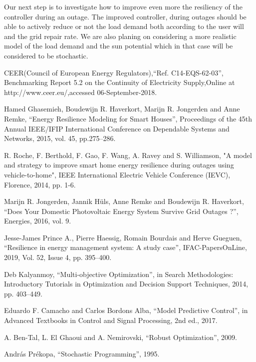 \documentclass[conference]{IEEEtran}
\begin{document}
 Our next step is to investigate how to improve even more the resiliency of the controller during an outage. The improved controller, during outages should be able to actively reduce or not the load demand both according to the user will and the grid repair rate. We are also planing on considering a more realistic model of the load demand and the sun potential which in that case will be considered to be stochastic.
 

\begin{thebibliography}{00}


 CEER(Council of European Energy Regulators),``Ref. C14-EQS-62-03'', Benchmarking Report 5.2 on the Continuity of Electricity Supply,Online at http://www.ceer.eu/,accessed 06-September-2018.

 Hamed Ghasemieh, Boudewijn R. Haverkort, Marijn R. Jongerden and Anne Remke, ``Energy Resilience Modeling for Smart Houses'', Proceedings of the 45th Annual IEEE/IFIP International Conference on Dependable Systems and Networks, 2015, vol. 45, pp.275--286.

 R. Roche, F. Berthold, F. Gao, F. Wang, A. Ravey and S. Williamson, "A model and strategy to improve smart home energy resilience during outages using vehicle-to-home", IEEE International Electric Vehicle Conference (IEVC), Florence, 2014, pp. 1-6.

 Marijn R. Jongerden, Jannik Hüls, Anne Remke and Boudewijn R. Haverkort, ``Does Your Domestic Photovoltaic Energy System Survive Grid Outages ?'', Energies, 2016, vol. 9.

 Jesse-James Prince A., Pierre Haessig, Romain Bourdais and Herve Gueguen, ``Resilience in energy management system: A study case'', IFAC-PapersOnLine, 2019, Vol. 52, Issue 4, pp. 395--400.

 Deb Kalyanmoy, ``Multi-objective Optimization'', in Search Methodologies: Introductory Tutorials in Optimization and Decision Support Techniques, 2014, pp. 403--449.

 Eduardo F. Camacho and Carlos Bordons Alba, ``Model Predictive Control'', in Advanced Textbooks in Control and Signal Processing, 2nd ed., 2017.

 A. Ben-Tal, L. El Ghaoui  and A. Nemirovski, ``Robust Optimization'', 2009.

 Andr\'as Pr\'ekopa, ``Stochastic Programming'', 1995.


\end{thebibliography}
\end{document}
